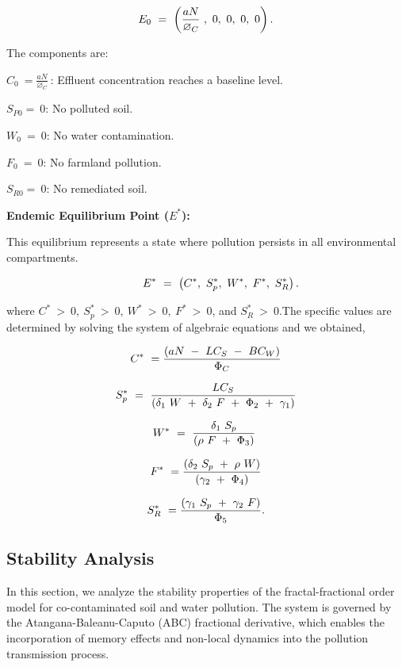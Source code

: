 \documentclass[10pt]{NSP1}
\newcommand{\fitwidth}[1]{\resizebox{\ifdim\width>\linewidth\linewidth\else\width\fi}{!}{#1}}
\begin{document}
\[
\fitwidth{$\displaystyle E_{0}\  = \ \left( \frac{aN}{\varnothing_{C}}\ ,\ 0,\ 0,\ 0,\ 0 \right).$}
\]

The components are:

\(C_{0}\  = \frac{aN}{\varnothing_{C}}\ \): Effluent concentration reaches a baseline level.

\(S_{P0} = \ 0\): No polluted soil.

\(W_{0}\  = \ 0\): No water contamination.

\(F_{0}\  = \ 0\): No farmland pollution.

\(S_{R0} = \ 0\): No remediated soil.

\textbf{Endemic Equilibrium Point (}\(E^{*}\)\textbf{):}

This equilibrium represents a state where pollution persists in all environmental compartments.

\[
\fitwidth{$\displaystyle \ \ \ \ \ \ \ \ E^{*}\  = \ \left( C^{*},\ S_{p}^{*},\ W^{*},\ F^{*},\ S_{R}^{*} \right).$}
\]

where \(C^{*}\  > \ 0,\ S_{p}^{*}\  > \ 0,\ W^{*}\  > \ 0,\ F^{*}\  > \ 0\), and \(S_{R}^{*}\  > \ 0\).The specific values are determined by solving the system of algebraic equations and we obtained,

\[
\fitwidth{$\displaystyle C^{*}\  = \frac{\left( aN\  - \ LC_{S}\  - \ BC_{W} \right)}{\Phi_{C}}$}
\]

\[
\fitwidth{$\displaystyle S_{p}^{*}\  = \ \frac{LC_{S}}{\left( \delta_{1}\ W\  + \ \delta_{2}\ F\  + \ \Phi_{2}\  + \ \gamma_{1} \right)}{}$}
\]

\[
\fitwidth{$\displaystyle W^{*}\  = \ \frac{\delta_{1}\ S_{p}}{(\rho\ F\  + \ \Phi_{3})}\ {}$}
\]

\[
\fitwidth{$\displaystyle F^{*}\  = \frac{\left( \delta_{2}\ S_{p}\  + \ \rho\ W \right)}{\left( \gamma_{2}\  + \ \Phi_{4} \right)}$}
\]

\[
\fitwidth{$\displaystyle S_{R}^{*}\  = \frac{\left( \gamma_{1}\ S_{p}\  + \ \gamma_{2}\ F \right)}{\Phi_{5}}.$}
\]

\subsection{Stability Analysis}

In this section, we analyze the stability properties of the fractal-fractional order model for co-contaminated soil and water pollution. The system is governed by the Atangana-Baleanu-Caputo (ABC) fractional derivative, which enables the incorporation of memory effects and non-local dynamics into the pollution transmission process.
\end{document}
